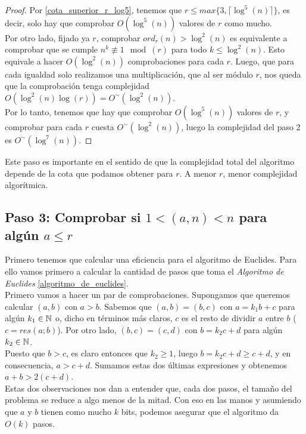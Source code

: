 \begin{proof}
	Por \autoref{cota_superior_r_log5}, tenemos que $r \leq max\{3, \lceil \log^5(n) \rceil \}$, es decir, solo hay que comprobar $O(\log^5(n))$ valores de $r$ como mucho.\\
	
	Por otro lado, fijado ya $r$, comprobar $ord_r(n) > \log^2(n)$ es equivalente a comprobar que se cumple $n^k \not\equiv 1 \mod(r)$ para todo $k \leq \log^2(n)$. Esto equivale a hacer $O(\log^2(n))$ comprobaciones para cada $r$. Luego, que para cada igualdad solo realizamos una multiplicación, que al ser módulo $r$, nos queda que la comprobación tenga complejidad $O(\log^2(n)\log(r)) = O^\sim(\log^2(n))$.\\
	
	Por lo tanto, tenemos que hay que comprobar $O(\log^5(n))$ valores de $r$, y comprobar para cada $r$ cuesta $O^\sim(\log^2(n))$, luego la complejidad del paso 2 es $O^\sim(\log^7(n))$.
\end{proof}

Este paso es importante en el sentido de que la complejidad total del algoritmo depende de la cota que podamos obtener para $r$. A menor $r$, menor complejidad algorítmica.

\subsection{Paso 3: Comprobar si $1 < (a, n) < n$ para algún $a \leq r$}

Primero tenemos que calcular una eficiencia para el algoritmo de Euclides. Para ello vamos primero a calcular la cantidad de pasos que toma el \textit{Algoritmo de Euclides} \ref{algoritmo_de_euclides}.\\

Primero vamos a hacer un par de comprobaciones. Supongamos que queremos calcular $(a, b)$ con $a > b$. Sabemos que $(a, b) = (b, c)$ con $a = k_1b + c$ para algún $k_1 \in \mathbb{N}$ o, dicho en términos más claros, $c$ es el resto de dividir $a$ entre $b$ ($c = res(a; b)$). Por otro lado, $(b, c) = (c, d)$ con $b = k_2c + d$ para algún $k_2 \in \mathbb{N}$.\\

Puesto que $b > c$, es claro entonces que $k_2 \geq 1$, luego $b = k_2c + d \geq c + d$, y en consecuencia, $a > c + d$. Sumamos estas dos últimas expresiones y obtenemos $a + b > 2(c + d)$.\\

Estas dos observaciones nos dan a entender que, cada dos pasos, el tamaño del problema se reduce a algo menos de la mitad. Con eso en las manos y asumiendo que $a$ y $b$ tienen como mucho $k$ bits, podemos asegurar que el algoritmo da $O(k)$ pasos.\\

